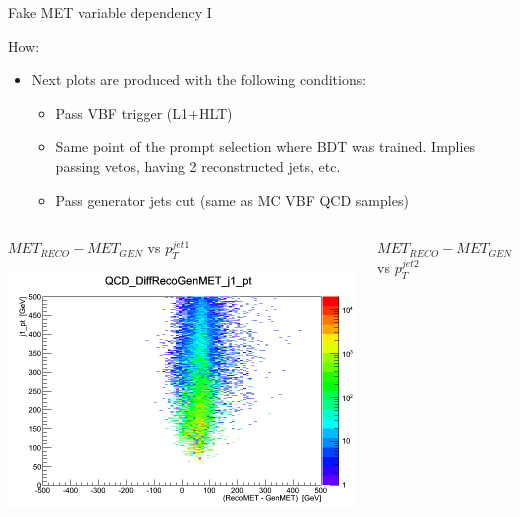 \documentclass[8pt]{beamer}
\begin{document}
\begin{frame}{Fake MET variable dependency I}
 
\begin{block}{How:}

  \begin{itemize}
    \item Next plots are produced with the following conditions:
    \begin{itemize}
      \item Pass VBF trigger (L1+HLT)
      \item Same point of the prompt selection where BDT was trained. Implies passing vetos, having 2 reconstructed jets, etc.
      \item Pass generator jets cut (same as MC VBF QCD samples)
    \end{itemize}
  \end{itemize}

\end{block}

\begin{columns}

\begin{block}{$MET_{RECO}-MET_{GEN}$ vs $p_T^{jet1}$}
 
\centering
\includegraphics[width=\linewidth]{img/QCD_DiffRecoGenMET_j1_pt.png} 

\end{block}

\begin{block}{$MET_{RECO}-MET_{GEN}$ vs $p_T^{jet2}$}
 

\end{block}
\end{columns}
\end{frame}
\end{document}

